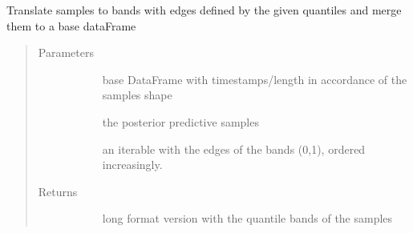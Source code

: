 \documentclass[letterpaper,10pt,english]{sphinxmanual}
\begin{document}
\begin{fulllineitems}
\label{\detokenize{autoapi/src/model/format/index:src.model.format.make_quantile_bands}}
Translate samples to bands with edges defined by the given quantiles and merge them to a base dataFrame
\begin{quote}\begin{description}
\item[{Parameters}] \leavevmode\begin{description}
\item[{}] \leavevmode{[}\sphinxcode{\sphinxupquote{pd.DataFrame}}{]}
base DataFrame with timestamps/length in accordance of the samples shape

\item[{}] \leavevmode{[}\sphinxcode{\sphinxupquote{np.array}}{]}
the posterior predictive samples

\item[{}] \leavevmode
an iterable with the edges of the bands (0,1), ordered increasingly.

\end{description}

\item[{Returns}] \leavevmode\begin{description}
\item[{}] \leavevmode
long format version with the quantile bands of the samples

\end{description}

\end{description}\end{quote}

\end{fulllineitems}

\end{document}
